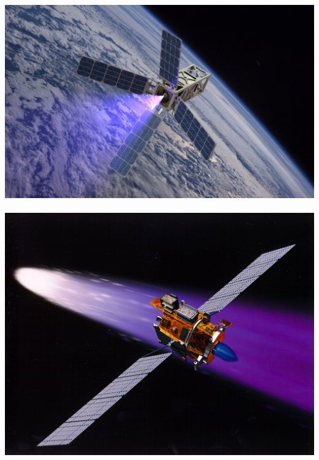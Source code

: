 \documentclass[11pt,professionalfonts]{beamer}
\begin{document}
\begin{frame}
\begin{center}
    \includegraphics[height=0.3\textheight]{figures/patriot_plume.jpg}
    ~
    \includegraphics[height=0.3\textheight]{figures/deepspace1.jpg}
\end{center}
\end{frame}   %
\end{document}
